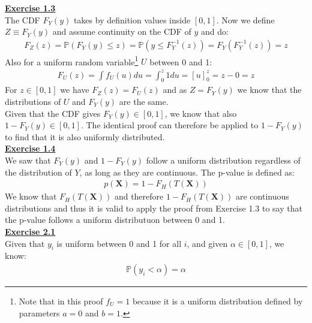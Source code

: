 \documentclass[a4paper, 11pt]{article}
\begin{document}
\newline \textbf{\underline{Exercise 1.3}}\\
\newline The CDF $F_Y(y)$ takes by definition values inside $[0, 1]$. Now we define $Z \equiv F_Y(y)$ and assume continuity on the CDF of $y$ and do:
\begin{eqnarray}
F_Z (z) = \mathbb{P}(F_Y(y) \leq z) = \mathbb{P}(y \leq F_Y^{-1}(z)) = F_Y(F_Y^{-1}(z)) = z \nonumber
\end{eqnarray}
Also for a uniform random variable\footnote{Note that in this proof $f_U = 1$ because it is a uniform distribution defined by parameters $a=0$ and $b=1$.} $U$ between 0 and 1:
\begin{eqnarray}
F_U (z) = \int f_U (u) du = \int_0^z 1 du = [u]_{0}^{z} = z - 0 = z \nonumber
\end{eqnarray}
For $z \in [0,1]$ we have $F_Z (z) = F_U (z)$ and as $Z = F_Y(y)$ we know that the distributions of $U$ and $F_Y(y)$ are the same.\\
\newline Given that the CDF gives $F_Y(y) \in [0,1]$, we know that also $1 - F_Y(y) \in [0,1]$. The identical proof can therefore be applied to $1 - F_Y(y)$ to find that it is also uniformly distributed.\\
\newline \textbf{\underline{Exercise 1.4}}\\
\newline We saw that $F_Y (y)$ and $1-F_Y (y)$ follow a uniform distribution regardless of the distribution of $Y$, as long as they are continuous. The p-value is defined as:
\begin{eqnarray}
p(\mathbf{X})=1 - F_H(T(\mathbf{X})) \nonumber
\end{eqnarray}
We know that $F_H(T(\mathbf{X}))$ and therefore $1-F_H(T(\mathbf{X}))$ are continuous distributions and thus it is valid to apply the proof from Exercise 1.3 to say that the p-value follows a uniform distributuon between 0 and 1.\\
\newpage
\textbf{\underline{Exercise 2.1}}\\
\newline Given that $y_i$ is uniform between 0 and 1 for all $i$, and given $\alpha \in [0,1]$, we know:
\begin{eqnarray}
\mathbb{P}(y_i < \alpha) = \alpha \nonumber
\end{eqnarray}
\end{document}

